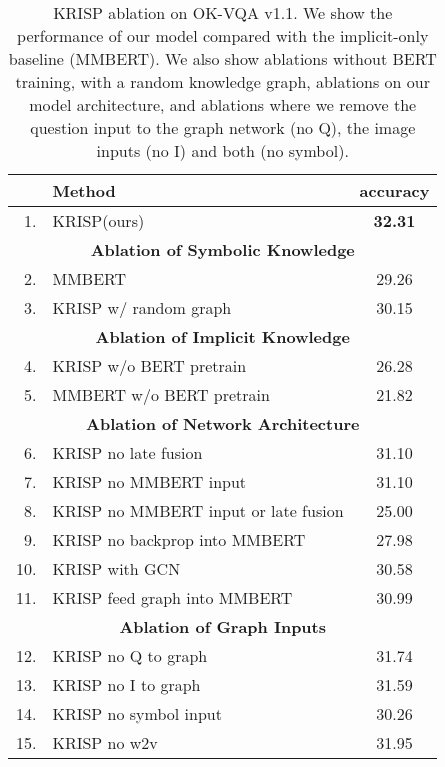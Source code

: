 \documentclass[final]{cvpr}
\providecommand{\ModelName}{KRISP\xspace}
\providecommand{\MMBERTAbr}{MMBERT\xspace}
\begin{document}
\begin{table}[t]
\begin{center}
\begin{tabular}{@{}rlc@{}}
\toprule
&Method & accuracy\\ \midrule
1. & \ModelName (ours) & \bf{32.31} \\
\hline
\multicolumn{3}{c}{\textbf{Ablation of Symbolic Knowledge}}\\
2. & \MMBERTAbr & 29.26 \\
3. & \ModelName w/ random graph & 30.15 \\
\hline
\multicolumn{3}{c}{\textbf{Ablation of Implicit Knowledge}}\\
4. & \ModelName  w/o BERT pretrain & 26.28  \\
5. & \MMBERTAbr w/o BERT pretrain & 21.82  \\
\hline
\multicolumn{3}{c}{\textbf{Ablation of Network Architecture}}\\
6. & \ModelName no late fusion & 31.10 \\
7. & \ModelName no \MMBERTAbr input & 31.10 \\
8. & \ModelName no \MMBERTAbr input or late fusion & 25.00 \\
9. & \ModelName no backprop into \MMBERTAbr & 27.98 \\
10. & \ModelName with GCN & 30.58 \\
11. & \ModelName feed graph into \MMBERTAbr & 30.99 \\
\hline
\multicolumn{3}{c}{\textbf{Ablation of Graph Inputs}}\\
12. & \ModelName no Q to graph & 31.74\\
13. & \ModelName no I to graph & 31.59\\
14. & \ModelName no symbol input & 30.26 \\
15. & \ModelName no w2v & 31.95  \\
\bottomrule
\end{tabular}
\end{center}
\caption{\ModelName ablation on OK-VQA v1.1. We show the performance of our model compared with the implicit-only baseline (\MMBERTAbr). We also show ablations without BERT training, with a random knowledge graph, ablations on our model architecture, and ablations where we remove the question input to the graph network (no Q), the image inputs (no I) and both (no symbol).}
\label{table:AllAblation}
\vspace{-.2cm}
\end{table}
\end{document}
